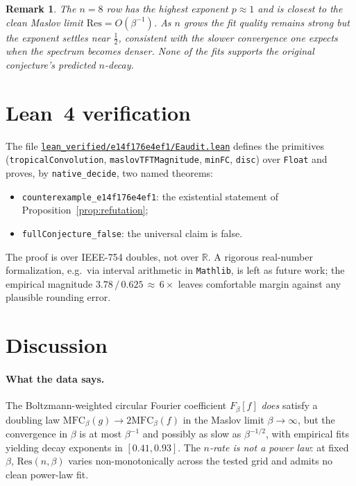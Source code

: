 \documentclass[11pt,a4paper]{article}
\newtheorem*{remark*}{Remark}
\begin{document}
\begin{remark*}
The $n=8$ row has the highest exponent $p \approx 1$ and is closest to the
clean Maslov limit $\mathrm{Res} = O(\beta^{-1})$. As $n$ grows the
fit quality remains strong but the exponent settles near
$\tfrac{1}{2}$, consistent with the slower convergence one expects when
the spectrum becomes denser. None of the fits supports the original
conjecture's predicted $n$-decay.
\end{remark*}

\section{Lean~4 verification}\label{sec:lean}

The file
\href{https://github.com/ludwigkubler/SperimentalMath/blob/main/lean_verified/e14f176e4ef1/Eaudit.lean}{\texttt{lean\_verified/e14f176e4ef1/Eaudit.lean}}
defines the primitives (\texttt{tropicalConvolution}, \texttt{maslovTFTMagnitude},
\texttt{minFC}, \texttt{disc}) over \texttt{Float} and proves, by
\texttt{native\_decide}, two named theorems:
\begin{itemize}
\item \texttt{counterexample\_e14f176e4ef1}: the existential statement of
Proposition~\ref{prop:refutation};
\item \texttt{fullConjecture\_false}: the universal claim is false.
\end{itemize}

The proof is over IEEE-754 doubles, not over $\mathbb{R}$. A rigorous
real-number formalization, e.g.\ via interval arithmetic in
\texttt{Mathlib}, is left as future work; the empirical magnitude
$3.78\,/\,0.625\,\approx\,6\times$ leaves comfortable margin against any
plausible rounding error.

\section{Discussion}\label{sec:discussion}

\paragraph{What the data says.}
The Boltzmann-weighted circular Fourier coefficient $F_\beta[f]$
\emph{does} satisfy a doubling law $\mathrm{MFC}_\beta(g) \to 2\mathrm{MFC}_\beta(f)$
in the Maslov limit $\beta \to \infty$, but the convergence in $\beta$
is at most $\beta^{-1}$ and possibly as slow as $\beta^{-1/2}$, with
empirical fits yielding decay exponents in $[0.41, 0.93]$. The
\emph{$n$-rate is not a power law}: at fixed $\beta$, $\mathrm{Res}(n,\beta)$
varies non-monotonically across the tested grid and admits no clean
power-law fit.
\end{document}
